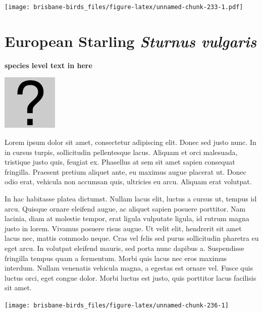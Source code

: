 \documentclass[]{book}
\let\origfigure\figure
\let\endorigfigure\endfigure
\renewenvironment{figure}[1][2] {
  \expandafter\origfigure\expandafter[H]
} {
  \endorigfigure
}
\begin{document}
\begin{figure}
\centering
\texttt{[image: brisbane-birds\_files/figure-latex/unnamed-chunk-233-1.pdf]}
\caption{\label{fig:unnamed-chunk-233}insert figure caption}
\end{figure}

\section{\texorpdfstring{European Starling \emph{Sturnus
vulgaris}}{European Starling Sturnus vulgaris}}\label{european-starling-sturnus-vulgaris}

\textbf{species level text in here}

\begin{figure}
\centering
\includegraphics{assets/missing.png}
\caption{No image for species}
\end{figure}

Lorem ipsum dolor sit amet, consectetur adipiscing elit. Donec sed justo
nunc. In in cursus turpis, sollicitudin pellentesque lacus. Aliquam et
orci malesuada, tristique justo quis, feugiat ex. Phasellus at sem sit
amet sapien consequat fringilla. Praesent pretium aliquet ante, eu
maximus augue placerat ut. Donec odio erat, vehicula non accumsan quis,
ultricies eu arcu. Aliquam erat volutpat.

In hac habitasse platea dictumst. Nullam lacus elit, luctus a cursus ut,
tempus id arcu. Quisque ornare eleifend augue, ac aliquet sapien posuere
porttitor. Nam lacinia, diam at molestie tempor, erat ligula vulputate
ligula, id rutrum magna justo in lorem. Vivamus posuere risus augue. Ut
velit elit, hendrerit sit amet lacus nec, mattis commodo neque. Cras vel
felis sed purus sollicitudin pharetra eu eget arcu. In volutpat eleifend
mauris, sed porta nunc dapibus a. Suspendisse fringilla tempus quam a
fermentum. Morbi quis lacus nec eros maximus interdum. Nullam venenatis
vehicula magna, a egestas est ornare vel. Fusce quis luctus orci, eget
congue dolor. Morbi luctus est justo, quis porttitor lacus facilisis sit
amet.

\begin{figure}
\texttt{[image: brisbane-birds\_files/figure-latex/unnamed-chunk-236-1]} \caption{insert figure caption}\label{fig:unnamed-chunk-236}
\end{figure}
\end{document}
